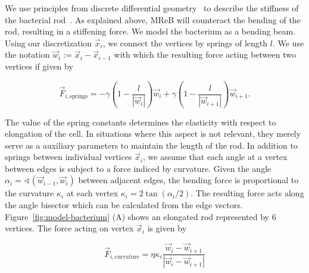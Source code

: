 \documentclass{article}
\begin{document}
We use principles from discrete differential geometry~\cite{bobenko2008discrete} to describe the
stiffness of the bacterial rod~\cite{Amir2014_2}.
As explained above, MReB will counteract the bending of the rod, resulting in a stiffening force.
We model the bacterium as a bending beam.
Using our discretization $\vec{x}_i$, we connect the vertices by springs of length $l$.
We use the notation $\vec{w}_i:=\vec{x}_i-\vec{x}_{i-1}$ with which the resulting force acting
between two vertices if given by

\begin{equation}
    \vec{F}_{i,\text{springs}} =
        -\gamma\left(1 - \frac{l}{\left|\vec{w}_i\right|}\right) \vec{w}_i
        + \gamma\left(1 - \frac{l}{\left|\vec{w}_{i+1}\right|}\right) \vec{w}_{i+1}.
\end{equation}

The value of the spring constants determines the elasticity with respect to elongation of the cell.
In situations where this aspect is not relevant, they merely serve as a auxiliary parameters to
maintain the length of the rod.
In addition to springs between individual vertices $\vec{x}_i$, we assume that each angle at a
vertex between edges is subject to a force indiced by curvature.
Given the angle $\alpha_i = \sphericalangle(\vec{w}_{i-1},\vec{w}_i)$ between adjacent edges,
the bending force is proportional to the curvature $\kappa_i$ at each vertex
$\kappa_i = 2\tan(\alpha_i/2)$.
The resulting force acts along the angle bisector which can be calculated from the edge vectors.
Figure~\ref{fig:model-bacterium} (A) shows an elongated rod represented by $6$ vertices.
The force acting on vertex $\vec{x}_i$ is given by

\begin{equation}
    \vec{F}_{i,\text{curvature}} = \eta\kappa_i
        \frac{\vec{w}_i - \vec{w}_{i+1}}{|\vec{w}_i-\vec{w}_{i+1}|}
\end{equation}
\end{document}
